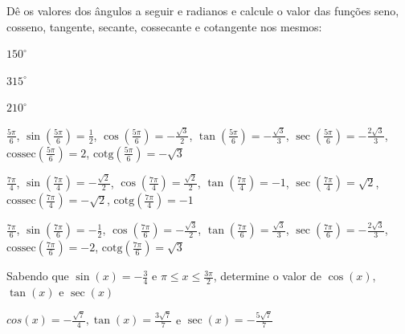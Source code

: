 \begin{exercises*}
\begin{exercise}
  Dê os valores dos ângulos a seguir e radianos e calcule o valor das
  funções seno, cosseno, tangente, secante, cossecante e cotangente nos
  mesmos:
  \begin{alphalist}
    \item $150^{\circ}$
    \item $315^{\circ}$
    \item $210^{\circ}$
  \end{alphalist}

  \begin{answer}
    \begin{alphalist}
      \item $\frac{5\pi}{6}$, $\sin\left(\frac{5\pi}{6}\right) =
           \frac{1}{2}$, $\cos\left(\frac{5\pi}{6}\right) =
           -\frac{\sqrt{3}}{2}$, $\tan\left(\frac{5\pi}{6}\right) =
           -\frac{\sqrt{3}}{3}$, $\sec\left(\frac{5\pi}{6}\right) =
           -\frac{2\sqrt{3}}{3}$, $\text{cossec}\left(\frac{5\pi}{6}\right) =
           2$, $\text{cotg}\left(\frac{5\pi}{6}\right) = -\sqrt{3}$
      \item $\frac{7\pi}{4}$, $\sin\left(\frac{7\pi}{4}\right) =
           -\frac{\sqrt{2}}{2}$, $\cos\left(\frac{7\pi}{4}\right) =
           \frac{\sqrt{2}}{2}$, $\tan\left(\frac{7\pi}{4}\right) = -1$,
           $\sec\left(\frac{7\pi}{4}\right) = \sqrt{2}$,
           $\text{cossec}\left(\frac{7\pi}{4}\right) = -\sqrt{2}$,
           $\text{cotg}\left(\frac{7\pi}{4}\right) = -1$
      \item $\frac{7\pi}{6}$, $\sin\left(\frac{7\pi}{6}\right) =
           -\frac{1}{2}$, $\cos\left(\frac{7\pi}{6}\right) =
           -\frac{\sqrt{3}}{2}$, $\tan\left(\frac{7\pi}{6}\right) =
           \frac{\sqrt{3}}{3}$, $\sec\left(\frac{7\pi}{6}\right) =
           -\frac{2\sqrt{3}}{3}$, $\text{cossec}\left(\frac{7\pi}{6}\right) =
           -2$, $\text{cotg}\left(\frac{7\pi}{6}\right) = \sqrt{3}$
    \end{alphalist}
  \end{answer}
\end{exercise}

\begin{exercise}
  Sabendo que $\sin(x)=-\frac{3}{4}$ e $\pi \leq x \leq \frac{3\pi}{2}$,
  determine o valor de $\cos(x)$, $\tan(x)$ e $\sec(x)$

  \begin{answer}
    $cos(x)=-\frac{\sqrt{7}}{4}, \tan(x)=\frac{3\sqrt{7}}{7}$ e
    $\sec(x)=-\frac{5\sqrt{7}}{7}$
  \end{answer}
\end{exercise}


\end{exercises*}
